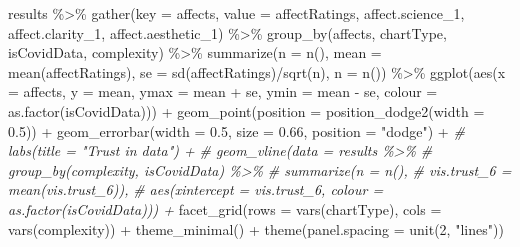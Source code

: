 \documentclass[
]{article}
\newenvironment{Shaded}{\begin{snugshade}}{\end{snugshade}}
\newcommand{\AttributeTok}[1]{\textcolor[rgb]{0.77,0.63,0.00}{#1}}
\newcommand{\CommentTok}[1]{\textcolor[rgb]{0.56,0.35,0.01}{\textit{#1}}}
\newcommand{\DecValTok}[1]{\textcolor[rgb]{0.00,0.00,0.81}{#1}}
\newcommand{\FloatTok}[1]{\textcolor[rgb]{0.00,0.00,0.81}{#1}}
\newcommand{\FunctionTok}[1]{\textcolor[rgb]{0.00,0.00,0.00}{#1}}
\newcommand{\NormalTok}[1]{#1}
\newcommand{\SpecialCharTok}[1]{\textcolor[rgb]{0.00,0.00,0.00}{#1}}
\newcommand{\StringTok}[1]{\textcolor[rgb]{0.31,0.60,0.02}{#1}}
\begin{document}
\begin{Shaded}
\begin{Highlighting}[]
\NormalTok{results }\SpecialCharTok{\%\textgreater{}\%}
  \FunctionTok{gather}\NormalTok{(}\AttributeTok{key =}\NormalTok{ affects, }\AttributeTok{value =}\NormalTok{ affectRatings, affect.science\_1,  affect.clarity\_1, affect.aesthetic\_1) }\SpecialCharTok{\%\textgreater{}\%}
  \FunctionTok{group\_by}\NormalTok{(affects, chartType, isCovidData, complexity) }\SpecialCharTok{\%\textgreater{}\%}
  \FunctionTok{summarize}\NormalTok{(}\AttributeTok{n =} \FunctionTok{n}\NormalTok{(),}
            \AttributeTok{mean =} \FunctionTok{mean}\NormalTok{(affectRatings),}
            \AttributeTok{se =} \FunctionTok{sd}\NormalTok{(affectRatings)}\SpecialCharTok{/}\FunctionTok{sqrt}\NormalTok{(n),}
            \AttributeTok{n =} \FunctionTok{n}\NormalTok{()) }\SpecialCharTok{\%\textgreater{}\%}
  \FunctionTok{ggplot}\NormalTok{(}\FunctionTok{aes}\NormalTok{(}\AttributeTok{x =}\NormalTok{ affects, }\AttributeTok{y =}\NormalTok{ mean, }
             \AttributeTok{ymax =}\NormalTok{ mean }\SpecialCharTok{+}\NormalTok{ se, }\AttributeTok{ymin =}\NormalTok{ mean }\SpecialCharTok{{-}}\NormalTok{ se,}
             \AttributeTok{colour =} \FunctionTok{as.factor}\NormalTok{(isCovidData))) }\SpecialCharTok{+}
  \FunctionTok{geom\_point}\NormalTok{(}\AttributeTok{position =} \FunctionTok{position\_dodge2}\NormalTok{(}\AttributeTok{width =} \FloatTok{0.5}\NormalTok{)) }\SpecialCharTok{+}
  \FunctionTok{geom\_errorbar}\NormalTok{(}\AttributeTok{width =} \FloatTok{0.5}\NormalTok{, }\AttributeTok{size =} \FloatTok{0.66}\NormalTok{, }\AttributeTok{position =} \StringTok{"dodge"}\NormalTok{) }\SpecialCharTok{+}
  \CommentTok{\# labs(title = "Trust in data") + }
  \CommentTok{\# geom\_vline(data = results \%\textgreater{}\% }
  \CommentTok{\#              group\_by(complexity, isCovidData) \%\textgreater{}\%}
  \CommentTok{\#              summarize(n = n(), }
  \CommentTok{\#                        vis.trust\_6 = mean(vis.trust\_6)), }
  \CommentTok{\#            aes(xintercept = vis.trust\_6, colour = as.factor(isCovidData))) +}
  \FunctionTok{facet\_grid}\NormalTok{(}\AttributeTok{rows =} \FunctionTok{vars}\NormalTok{(chartType), }\AttributeTok{cols =} \FunctionTok{vars}\NormalTok{(complexity)) }\SpecialCharTok{+}
  \FunctionTok{theme\_minimal}\NormalTok{() }\SpecialCharTok{+} 
  \FunctionTok{theme}\NormalTok{(}\AttributeTok{panel.spacing =} \FunctionTok{unit}\NormalTok{(}\DecValTok{2}\NormalTok{, }\StringTok{"lines"}\NormalTok{))}
\end{Highlighting}
\end{Shaded}
\end{document}

